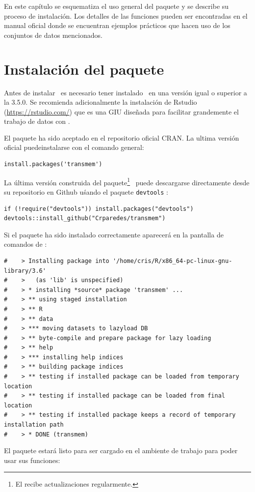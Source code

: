 En este capítulo se esquematiza el uso general del paquete y se describe su proceso de instalación. Los detalles de las funciones pueden ser encontradas en el manual oficial donde se encuentran ejemplos prácticos que hacen uso de los conjuntos de datos mencionados.

\clearpage
\section{Instalación del paquete}
\enlargethispage{1\baselineskip}
Antes de instalar \trm\ es necesario tener instalado \R\ en una versión igual o superior a la 3.5.0. Se recomienda adicionalmente la instalación de Rstudio (\url{https://rstudio.com/}) que es una \ac{GIU} diseñada para facilitar grandemente el trabajo de datos con \R. 

El paquete ha sido aceptado en el repositorio oficial \ac{CRAN}. La ultima versión oficial puedeinstalarse con el comando general:
\begin{lstlisting}[belowskip=-2.6\baselineskip]
install.packages('transmem')
\end{lstlisting}

La última versión construida del paquete\footnote{El recibe actualizaciones regularmente.} \trm\ puede descargarse directamente desde su repositorio en Github uśando el paquete \verb|devtools| \citep{Hadley2019}:
\begin{lstlisting}[belowskip=-2.6\baselineskip]
if (!require("devtools")) install.packages("devtools")
devtools::install_github("Crparedes/transmem")
\end{lstlisting}


Si el paquete ha sido instalado correctamente aparecerá en la pantalla de comandos de \R:
\begin{lstlisting}
#    > Installing package into '/home/cris/R/x86_64-pc-linux-gnu-library/3.6'
#    >   (as 'lib' is unspecified)
#    > * installing *source* package 'transmem' ...
#    > ** using staged installation
#    > ** R
#    > ** data
#    > *** moving datasets to lazyload DB
#    > ** byte-compile and prepare package for lazy loading
#    > ** help
#    > *** installing help indices
#    > ** building package indices
#    > ** testing if installed package can be loaded from temporary location
#    > ** testing if installed package can be loaded from final location
#    > ** testing if installed package keeps a record of temporary installation path
#    > * DONE (transmem)
\end{lstlisting}
El paquete estará listo para ser cargado en el ambiente de trabajo para poder usar sus funciones:

